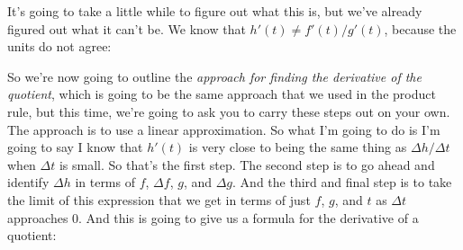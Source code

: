 \documentclass[pdftex, brazil, 12pt, twoside]{article}
\begin{document}
\begin{figure}[H]
  \begin{center}
  \end{center}
\end{figure}

It's going to take a little while to figure out
what this is, but we've already figured out what it can't be.
We know that $h'(t) \ne f'(t)/g'(t)$,
because the units do not agree:

\begin{figure}[H]
  \begin{center}
  \end{center}
\end{figure}

So we're now going to outline the \emph{approach
for finding the derivative of the quotient}, which
is going to be the same approach that we used in the product
rule, but this time, we're going to ask you to carry
these steps out on your own.
The approach is to use a linear approximation.
So what I'm going to do is I'm going
to say I know that $h'(t)$ is very close to being
the same thing as $\Delta h / \Delta t$ when $\Delta t$ is small.
So that's the first step.
The second step is to go ahead and identify $\Delta h$ in terms
of $f$, $\Delta f$, $g$, and $\Delta g$.
And the third and final step is to take
the limit of this expression that we
get in terms of just $f$, $g$, and $t$ as $\Delta t$ approaches $0$.
And this is going to give us a formula for the derivative
of a quotient:
\end{document}
